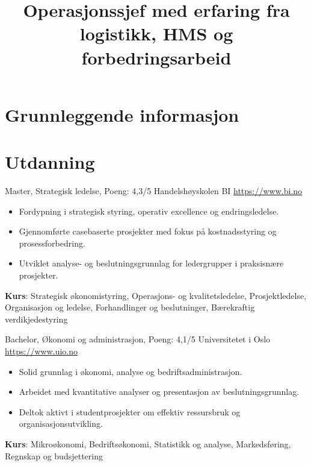 \documentclass[a4paper, serif, 10pt]{moderncv}
\title{Operasjonssjef med erfaring fra logistikk, HMS og forbedringsarbeid}
\begin{document}
\maketitle

\section{Grunnleggende informasjon}

\section{Utdanning}

        {Master, Strategisk ledelse, Poeng: 4,3/5}
        {Handelshøyskolen BI}
        {\url{https://www.bi.no}}
        {}
        {\begin{itemize}
\item Fordypning i strategisk styring, operativ excellence og endringsledelse.
\item Gjennomførte casebaserte prosjekter med fokus på kostnadsstyring og prosessforbedring.
\item Utviklet analyse- og beslutningsgrunnlag for ledergrupper i praksisnære prosjekter.
\end{itemize}
\textbf{Kurs}: Strategisk økonomistyring, Operasjons- og kvalitetsledelse, Prosjektledelse, Organisasjon og ledelse, Forhandlinger og beslutninger, Bærekraftig verdikjedestyring}

        {Bachelor, Økonomi og administrasjon, Poeng: 4,1/5}
        {Universitetet i Oslo}
        {\url{https://www.uio.no}}
        {}
        {\begin{itemize}
\item Solid grunnlag i økonomi, analyse og bedriftsadministrasjon.
\item Arbeidet med kvantitative analyser og presentasjon av beslutningsgrunnlag.
\item Deltok aktivt i studentprosjekter om effektiv ressursbruk og organisasjonsutvikling.
\end{itemize}
\textbf{Kurs}: Mikroøkonomi, Bedriftsøkonomi, Statistikk og analyse, Markedsføring, Regnskap og budsjettering}
\end{document}
